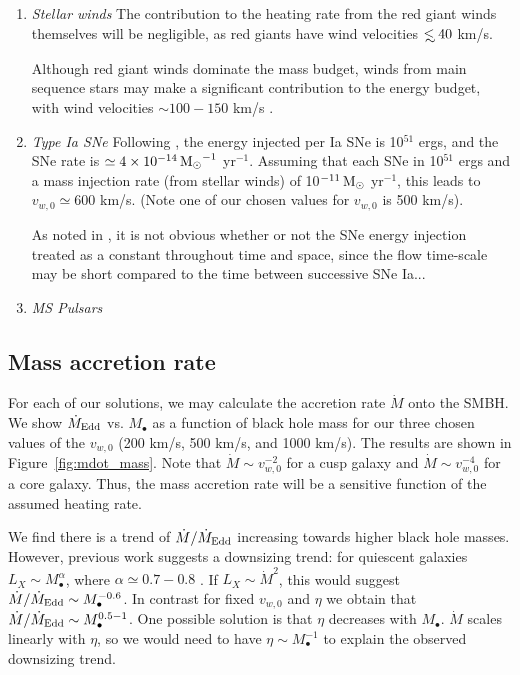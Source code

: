 \documentclass[usenatbib,fleqn]{mn2e}
\newcommand{\eddr}{\dot{M}/\dot{M}_{\rm Edd}}
\newcommand{\Mdote}{\dot{M}_{\rm Edd}}
\newcommand\lsim{\mathrel{\rlap{\lower4pt\hbox{\hskip1pt$\sim$}}
        \raise1pt\hbox{$<$}}}
\newcommand{\Mbh}[1][]{M_{\bullet#1}}
\newcommand{\vwO}{v_{w,0}}
\begin{document}
\begin{enumerate}
\item \emph{Stellar winds} The contribution to the heating rate from the red giant winds themselves will be negligible, as red giants have wind velocities $\lsim 40$ km/s.

Although red giant winds dominate the mass budget, winds from main sequence stars may make a significant contribution to the energy budget, with wind velocities $\sim 100-150$ km/s \citep{NaimanSoares-Furtado+:2013a}. 

\item \emph{Type Ia SNe} Following \citealt{ShcherbakovWong+:2014a}, the energy injected per Ia SNe is 10$^{51}$ ergs, and the SNe rate is $\simeq 4 \times 10^{-14} \,{\rm M_\odot}^{-1}$ yr$^{-1}$.  Assuming that each SNe in 10$^{51}$ ergs and a mass injection rate (from stellar winds) of 10$^{-11} \,{\rm M_\odot}$  yr$^{-1}$, this leads to $\vwO\simeq 600$ km/s.  (Note one of our chosen values for $\vwO$ is 500 km/s).

As noted in \citealt{ShcherbakovWong+:2014a}, it is not obvious whether or not the SNe energy injection treated as a constant throughout time and space, since the flow time-scale may be short compared to the time between successive SNe Ia...
\item \emph{MS Pulsars} 
\end{enumerate}


\subsection{Mass accretion rate}
For each of our solutions, we may calculate the accretion rate $\dot{M}$ onto the SMBH. We show $\Mdote$ vs. $\Mbh$ as a function of black hole mass for our three  chosen values of the $\vwO$ (200 km/s, 500 km/s, and 1000 km/s). The results are shown in Figure~\ref{fig:mdot_mass}.  Note that $\dot{M}\sim\vwO^{-2}$ for a cusp galaxy and $\dot{M}\sim\vwO^{-4}$ for a core galaxy. Thus, the mass accretion rate will be a sensitive function of the assumed heating rate.

We find there is a trend of $\eddr$ increasing towards higher black hole masses. However, previous work  suggests a downsizing trend: for quiescent galaxies $L_X \sim \Mbh^\alpha$, where $\alpha\simeq 0.7-0.8$ \citep{MillerGallo+:2014a}. If $L_X\sim\dot{M}^2$, this would suggest $\eddr\sim \Mbh^{-0.6}$. In contrast for fixed $\vwO$ and $\eta$ we obtain that $\eddr\sim \Mbh^{0.5-1}$. One possible solution is that $\eta$ decreases with $\Mbh$. $\dot{M}$ scales linearly with $\eta$, so we would need to have $\eta\sim \Mbh^{-1}$ to explain the observed downsizing trend.  
\end{document}
